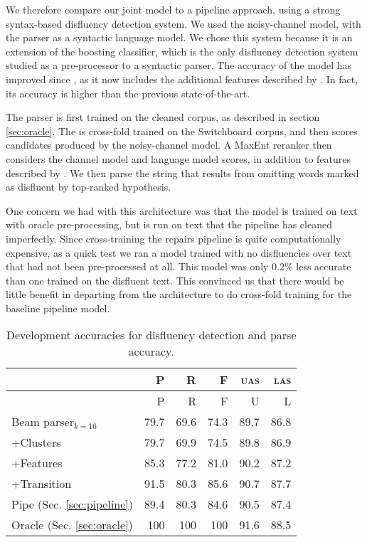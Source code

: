 \documentclass[11pt,letterpaper]{article}
\begin{document}
We therefore compare our joint model to a pipeline approach, using a strong 
syntax-based disfluency detection system.  We used the \citet{Johnson04a}
noisy-channel model, with the \citet{Charniak01b} parser as a syntactic language
model.  We chose this system because it is an extension of the \citet{Charniak01a}
boosting classifier, which is the only disfluency detection system studied as
a pre-processor to a syntactic parser.  The accuracy of the model has improved
since \citet{Johnson04a}, as it now includes the additional features described by
\citet{zwarts:11}.  In fact, its accuracy is higher than the previous state-of-the-art.

The parser is first trained on the cleaned corpus, as described in section
\ref{sec:oracle}. The \citet{Charniak01a} is cross-fold trained on the Switchboard
corpus, and then scores candidates produced by the \citet{Johnson04a} noisy-channel
model.  A MaxEnt reranker then considers the channel model and language model scores,
in addition to features described by \citet{zwarts:11}. We then parse the string
that results from omitting words marked as disfluent by top-ranked hypothesis.

One concern we had with this architecture was that the model is trained on text
with oracle pre-processing, but is run on text that the pipeline has cleaned
imperfectly.  Since cross-training the repairs pipeline is quite computationally
expensive, as a quick test we ran a model trained with no disfluencies over text
that had not been pre-processed at all.  This model was only 0.2\% less accurate
than one trained on the disfluent text.  This convinced us that there would be
little benefit in departing from the \citet{Charniak01a} architecture to do
cross-fold training for the baseline pipeline model.

\begin{table}
    \centering
    \small
    \begin{tabular}{l|rrr|rr}
        & P & R & F & \textsc{uas} & \textsc{las} \\
        \hline \hline
                    &	P	&	R	&	F	&	U	&	L \\
Beam parser$_{k=16}$ &	79.7	&	69.6	&	74.3	&	89.7	&	86.8 \\
+Clusters            &	79.7	&	69.9	&	74.5	&	89.8	&	86.9 \\
+Features            &	85.3	&	77.2	&	81.0	&	90.2	&	87.2 \\
+Transition          &	91.5	&	80.3	&	85.6	&	90.7	&	87.7 \\
\hline
Pipe (Sec. \ref{sec:pipeline})  & 89.4 & 80.3 & 84.6 & 90.5 & 87.4 \\
\hline       
Oracle (Sec. \ref{sec:oracle})  & 100 & 100 & 100 & 91.6    & 88.5 \\
\hline
    \end{tabular}
\caption{Development accuracies for disfluency detection and parse accuracy.}
\end{table}
\end{document}
